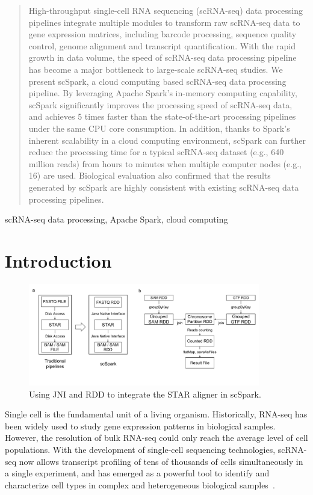 \documentclass[conference]{IEEEtran}
\begin{document}
\begin{abstract}
High-throughput single-cell RNA sequencing (scRNA-seq) data processing pipelines integrate multiple modules to transform raw scRNA-seq data to gene expression matrices, including barcode processing, sequence quality control, genome alignment and transcript quantification.
With the rapid growth in data volume, the speed of scRNA-seq data processing pipeline has become a major bottleneck to large-scale scRNA-seq studies. 
We present scSpark, a cloud computing based scRNA-seq data processing pipeline. 
By leveraging Apache Spark's in-memory computing capability, scSpark significantly improves the processing speed of scRNA-seq data, and achieves 5 times faster than the state-of-the-art processing pipelines under the same CPU core consumption.
In addition, thanks to Spark's inherent scalability in a cloud computing environment, scSpark can further reduce the processing time for a typical scRNA-seq dataset (e.g., 640 million reads) from hours to minutes when multiple computer nodes (e.g., 16) are used.  
Biological evaluation also confirmed that the results generated by scSpark are highly consistent with existing scRNA-seq data processing pipelines.
\end{abstract}

\begin{IEEEkeywords}
scRNA-seq data processing, Apache Spark, cloud computing
\end{IEEEkeywords}

\section{Introduction}
\begin{figure}
	\centering
	\includegraphics[width=0.9\textwidth]{fig1.pdf}
	\caption{Using JNI and RDD to integrate the STAR aligner in scSpark.} \label{fig1}
\end{figure}
Single cell is the fundamental unit of a living organism.
Historically, RNA-seq has been widely used to study gene expression patterns in biological samples.
However, the resolution of bulk RNA-seq could only reach the average level of cell populations. 
With the development of single-cell sequencing technologies, scRNA-seq now allows transcript profiling of tens of thousands of cells simultaneously in a single experiment, and has emerged as a powerful tool to identify and characterize cell types in complex and heterogeneous biological samples~\cite{Zhang2019ComparativeAO}.
\end{document}
